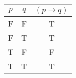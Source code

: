 \begin{tabular}{|c|c||c|}
\hline
$ p $ & $ q $ & $ (p \rightarrow q) $ \\
\hline
F & F & T \\
F & T & T \\
T & F & F \\
T & T & T \\
\hline
\end{tabular}
\label{table:tt1}
